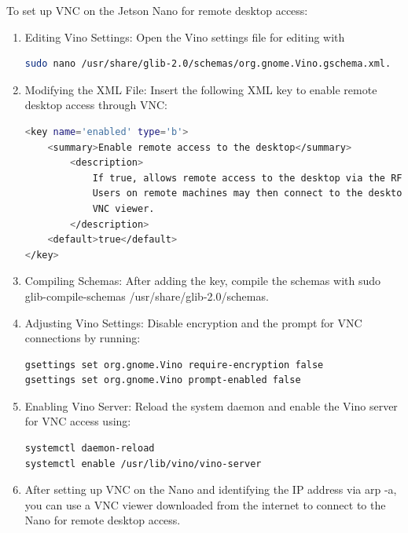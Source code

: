 \documentclass[a4paper,11pt]{article}%
\newenvironment{qanda}{\setlength{\parindent}{0pt}}{\bigskip}
\begin{document}
\begin{qanda}
\begin{enumerate}
\begin{enumerate}
\begin{enumerate}
				      \end{enumerate}



				      To set up VNC on the Jetson Nano for remote desktop access:

				      \begin{enumerate}
					      \item Editing Vino Settings: Open the Vino settings file for editing with
					            \begin{lstlisting}[language=bash]
sudo nano /usr/share/glib-2.0/schemas/org.gnome.Vino.gschema.xml.
\end{lstlisting}

					      \item Modifying the XML File: Insert the following XML key to enable remote desktop access through VNC:
					            \begin{lstlisting}[language=bash]
<key name='enabled' type='b'>
	<summary>Enable remote access to the desktop</summary>
		<description>
			If true, allows remote access to the desktop via the RFB protocol. 
			Users on remote machines may then connect to the desktop using a 
			VNC viewer.
		</description>
	<default>true</default>
</key>
\end{lstlisting}

					      \item Compiling Schemas: After adding the key, compile the schemas with sudo glib-compile-schemas /usr/share/glib-2.0/schemas.

					      \item Adjusting Vino Settings: Disable encryption and the prompt for VNC connections by running:
					            \begin{lstlisting}[language=bash]
gsettings set org.gnome.Vino require-encryption false
gsettings set org.gnome.Vino prompt-enabled false
\end{lstlisting}
					      \item Enabling Vino Server: Reload the system daemon and enable the Vino server for VNC access using:

					            \begin{lstlisting}[language=bash]
systemctl daemon-reload
systemctl enable /usr/lib/vino/vino-server
\end{lstlisting}
					      \item After setting up VNC on the Nano and identifying the IP address via arp -a, you can use a VNC viewer downloaded from the internet to connect to the Nano for remote desktop access.
				      \end{enumerate}




\end{enumerate}
\end{enumerate}
\end{qanda}
\end{document}
